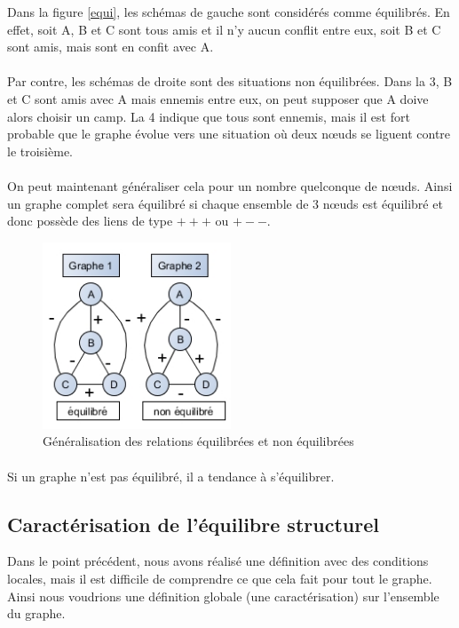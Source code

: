 Dans la figure \ref{equi}, les schémas de gauche sont considérés comme équilibrés. En effet, soit A, B et C sont tous amis et il n'y aucun conflit entre eux, soit B et C sont amis, mais sont en confit avec A. 
\paragraph{}
Par contre, les schémas de droite sont des situations non équilibrées. Dans la 3, B et C sont amis avec A mais ennemis entre eux, on peut supposer que A doive alors choisir un camp. La 4 indique que tous sont ennemis, mais il est fort probable que le graphe évolue vers une situation où deux nœuds se liguent contre le troisième. 

\paragraph{}
 
 On peut maintenant généraliser cela pour un nombre quelconque de nœuds. Ainsi un graphe complet sera équilibré si chaque ensemble de 3 nœuds est équilibré et donc possède des liens de type $+++$ ou $+--$.   

\begin{figure}[h!]
\label{equi2}
\caption{Généralisation des relations équilibrées et non équilibrées}
\centering
\includegraphics[width=0.5\textwidth]{images/22_situation2.png}
\end{figure}

\paragraph{}
Si un graphe n'est pas équilibré, il a tendance à s'équilibrer. 


\subsection{Caractérisation de l'équilibre structurel} 
Dans le point précédent, nous avons réalisé une définition avec des conditions locales, mais il est difficile de comprendre ce que cela fait pour tout le graphe.
Ainsi nous voudrions une définition globale (une caractérisation) sur l'ensemble du graphe.




